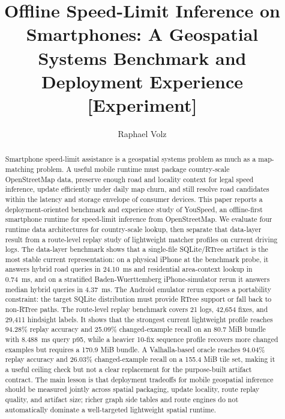 \documentclass[sigconf]{acmart}
\title{Offline Speed-Limit Inference on Smartphones: A Geospatial Systems Benchmark and Deployment Experience [Experiment]}
\author{Raphael Volz}
\affiliation{%
  \institution{Pforzheim University}
  \city{Pforzheim}
  \country{Germany}}
\begin{document}
\begin{abstract}
Smartphone speed-limit assistance is a geospatial systems problem as much as a map-matching problem. A useful mobile runtime must package country-scale OpenStreetMap data, preserve enough road and locality context for legal speed inference, update efficiently under daily map churn, and still resolve road candidates within the latency and storage envelope of consumer devices. This paper reports a deployment-oriented benchmark and experience study of YouSpeed, an offline-first smartphone runtime for speed-limit inference from OpenStreetMap. We evaluate four runtime data architectures for country-scale lookup, then separate that data-layer result from a route-level replay study of lightweight matcher profiles on current driving logs. The data-layer benchmark shows that a single-file SQLite/RTree artifact is the most stable current representation: on a physical iPhone at the benchmark probe, it answers hybrid road queries in \SI{24.10}{ms} and residential area-context lookup in \SI{0.74}{ms}, and on a stratified Baden-Wuerttemberg iPhone-simulator rerun it answers median hybrid queries in \SI{4.37}{ms}. The Android emulator rerun exposes a portability constraint: the target SQLite distribution must provide RTree support or fall back to non-RTree paths. The route-level replay benchmark covers 21 logs, 42,654 fixes, and 29,411 hindsight labels. It shows that the strongest current lightweight profile reaches 94.28\% replay accuracy and 25.09\% changed-example recall on an 80.7 MiB bundle with \SI{8.488}{ms} query p95, while a heavier 10-fix sequence profile recovers more changed examples but requires a 170.9 MiB bundle. A Valhalla-based oracle reaches 94.04\% replay accuracy and 26.03\% changed-example recall on a 155.4 MiB tile set, making it a useful ceiling check but not a clear replacement for the purpose-built artifact contract. The main lesson is that deployment tradeoffs for mobile geospatial inference should be measured jointly across spatial packaging, update locality, route replay quality, and artifact size; richer graph side tables and route engines do not automatically dominate a well-targeted lightweight spatial runtime.
\end{abstract}


\end{document}
